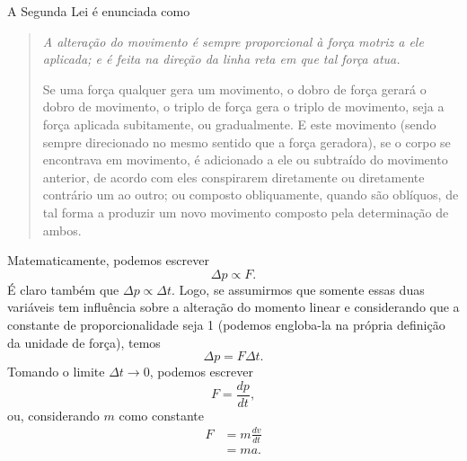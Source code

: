 A Segunda Lei é enunciada como
\begin{quote}
\emph{A alteração do movimento é sempre proporcional à força motriz a ele aplicada; e é feita na direção da linha reta em que tal força atua.}

Se uma força qualquer gera um movimento, o dobro de força gerará o dobro de movimento, o triplo de força gera o triplo de movimento, seja a força aplicada subitamente, ou gradualmente. E este movimento (sendo sempre direcionado no mesmo sentido que a força geradora), se o corpo se encontrava em movimento, é adicionado a ele ou subtraído do movimento anterior, de acordo com eles conspirarem diretamente ou diretamente contrário um ao outro; ou composto obliquamente, quando são oblíquos, de tal forma a produzir um novo movimento composto pela determinação de ambos.
\end{quote}
%
Matematicamente, podemos escrever
\begin{equation}
  \Delta p \propto F.
\end{equation}
%
É claro também que $\Delta p \propto \Delta t$. Logo, se assumirmos que somente essas duas variáveis tem influência sobre a alteração do momento linear e considerando que a constante de proporcionalidade seja 1 (podemos engloba-la na própria definição da unidade de força), temos
\begin{equation}
  \Delta p = F \Delta t.
\end{equation}
%
Tomando o limite $\Delta t \to 0$, podemos escrever
\begin{equation}
  F = \frac{dp}{dt},
\end{equation}
%
ou, considerando $m$ como constante
\begin{align}
  F &= m\frac{dv}{dt} \\
  &= ma.
\end{align}

